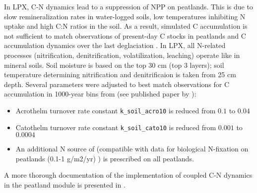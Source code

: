 In LPX, C-N dynamics lead to a suppression of NPP on peatlands. This is due to slow remineralization rates in water-logged soils, low temperatures inhibiting N uptake and high C:N ratios in the soil. As a result, simulated C accumulation is not sufficient to match observations of present-day C stocks in peatlands \citep{yu10grl} and C accumulation dynamics over the last deglaciation \citep{yu11hol}. In LPX, all N-related processes (nitrification, denitrification, volatilization, leaching) operate like in mineral soils. Soil moisture is based on the top 30 cm (top 3 layers); soil temperature determining nitrification and denitrificaion is taken from 25 cm depth. Several parameters were adjusted to best match observations for C accumulation in 1000-year bins from \citet{yu11hol} (see published paper by \citet{spahni13cp}):\\
\begin{itemize}
  \item Acrothelm turnover rate constant {\tt k\_soil\_acro10} is reduced from $0.1$ to $0.04$
  \item Catothelm turnover rate constant {\tt k\_soil\_cato10} is reduced from $0.001$ to $0.0004$
  \item An additional N source of  (compatible with data for biological N-fixation on peatlands (0.1-1 g/m2/yr) \citep{limpens06}) is prescribed on all peatlands.
\end{itemize}
A more thorough documentation of the implementation of coupled C-N dynamics in the peatland module is presented in \citet{spahni13cp}.
\clearpage

